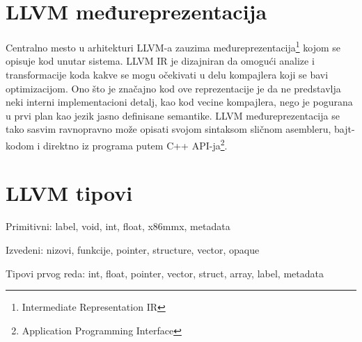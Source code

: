 \section{LLVM međureprezentacija}


Centralno mesto u arhitekturi LLVM-a\cite{aosa} zauzima međureprezentacija\footnote{\eng Intermediate Representation \ndash IR} kojom se opisuje kod unutar sistema. LLVM IR je dizajniran da omogući analize i transformacije koda kakve se mogu očekivati u delu kompajlera koji se bavi optimizacijom. Ono što je značajno kod ove reprezentacije je da ne predstavlja neki interni implementacioni detalj, kao kod vecine kompajlera, nego je pogurana u prvi plan kao jezik jasno definisane semantike. LLVM međureprezentacija se tako sasvim ravnopravno može opisati svojom sintaksom sličnom asembleru, bajt-kodom i direktno iz programa putem C++ API-ja\footnote{\eng Application Programming Interface}.


\section{LLVM tipovi}

Primitivni: label, void, int, float, x86mmx, metadata

Izvedeni: nizovi, funkcije, pointer, structure, vector, opaque

Tipovi prvog reda: int, float, pointer, vector, struct, array, label, metadata


